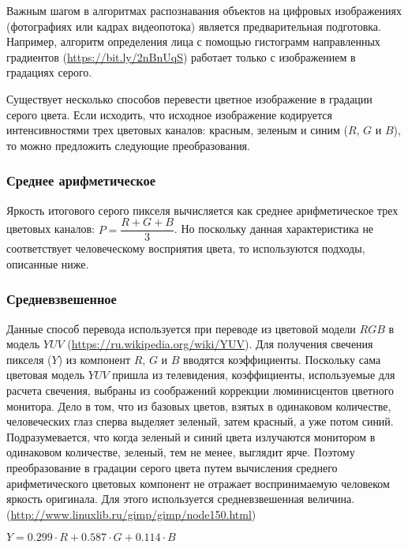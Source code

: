 
Важным шагом в алгоритмах распознавания объектов на цифровых изображениях (фотографиях или кадрах видеопотока) 
является предварительная подготовка. Например, алгоритм определения лица с помощью гистограмм направленных 
градиентов (\url{https://bit.ly/2nBnUqS}) работает только с изображением в градациях серого.

Существует несколько способов перевести цветное изображение в градации серого цвета. Если исходить, 
что исходное изображение кодируется интенсивностями трех цветовых каналов: красным, зеленым и синим 
($R$, $G$ и $B$), то можно предложить следующие преобразования.

\subsubsection*{Среднее арифметическое}

Яркость итогового серого пикселя вычисляется как среднее арифметическое трех цветовых каналов:
$P = \dfrac{R+G+B}{3}$. Но поскольку данная характеристика не соответствует человеческому восприятия цвета, то используются подходы, описанные ниже.

\subsubsection*{Средневзвешенное}

Данные способ перевода используется при переводе из цветовой модели $RGB$ в модель $YUV$ (\url{https://ru.wikipedia.org/wiki/YUV}). Для получения 
свечения пикселя ($Y$) из компонент $R$, $G$ и $B$ вводятся коэффициенты. Поскольку сама цветовая модель $YUV$ 
пришла из телевидения, коэффициенты, используемые для расчета свечения, выбраны из соображений коррекции 
люминисцентов цветного монитора. Дело в том, что из базовых цветов, взятых в одинаковом количестве, 
человеческих глаз сперва выделяет зеленый, затем красный, а уже потом синий. Подразумевается, что когда зеленый 
и синий цвета излучаются монитором в одинаковом количестве, зеленый, тем не менее, выглядит ярче. 
Поэтому преобразование в градации серого цвета путем вычисления среднего арифметического цветовых 
компонент не отражает воспринимаемую человеком яркость оригинала. Для этого используется средневзвешенная 
величина. (\url{http://www.linuxlib.ru/gimp/gimp/node150.html})

$Y = 0.299 \cdot R + 0.587 \cdot G + 0.114 \cdot B$

